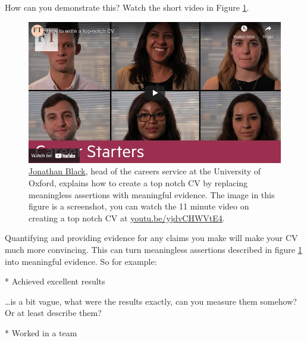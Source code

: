 \documentclass[
]{book}
\newenvironment{Shaded}{\begin{snugshade}}{\end{snugshade}}
\newcommand{\NormalTok}[1]{#1}
\newcommand{\SpecialStringTok}[1]{\textcolor[rgb]{0.31,0.60,0.02}{#1}}
\begin{document}
How can you demonstrate this? Watch the short video in Figure \ref{fig:black-fig}.

\begin{figure}

{\centering \includegraphics[width=0.99\linewidth]{images/youtube-jonathan-black} 

}

\caption{\href{https://twitter.com/jonathanpblack}{Jonathan Black}, head of the careers service at the University of Oxford, explains how to create a top notch CV by replacing meaningless assertions with meaningful evidence. \citep{topnotchcv} The image in this figure is a screenshot, you can watch the 11 minute video on creating a top notch CV at \href{https://youtu.be/yjdvCHWVtE4}{youtu.be/yjdvCHWVtE4}.}\label{fig:black-fig}
\end{figure}



Quantifying and providing evidence for any claims you make will make your CV much more convincing. This can turn meaningless assertions described in figure \ref{fig:black-fig} into meaningful evidence. So for example:

\begin{Shaded}
\begin{Highlighting}[]
\SpecialStringTok{* }\NormalTok{Achieved excellent results}
\end{Highlighting}
\end{Shaded}

\ldots is a bit vague, what were the results exactly, can you measure them somehow? Or at least describe them?

\begin{Shaded}
\begin{Highlighting}[]
\SpecialStringTok{* }\NormalTok{Worked in a team}
\end{Highlighting}
\end{Shaded}
\end{document}
